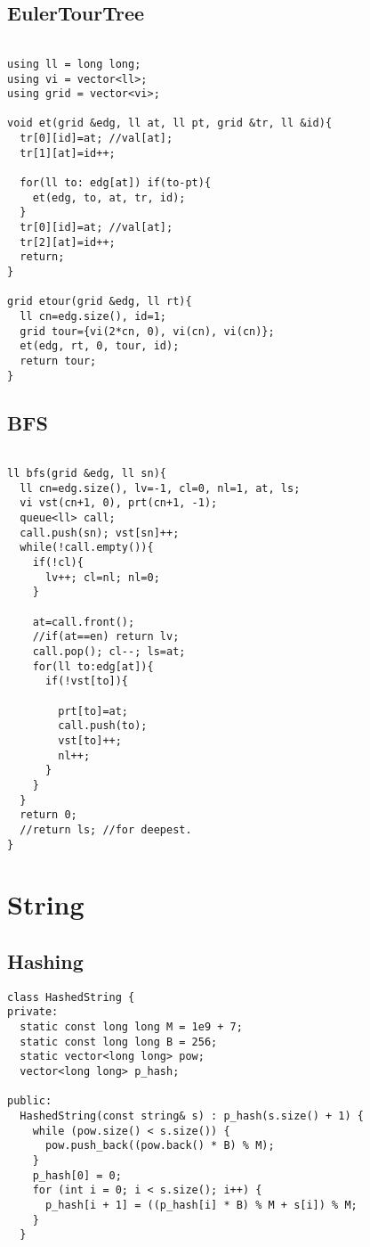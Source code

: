 \documentclass[FSZ,a4paper,onesided]{article}
\begin{document}
\begin{multicols*}{\COLS}
\subsection{EulerTourTree}
\begin{lstlisting}

using ll = long long;
using vi = vector<ll>;
using grid = vector<vi>;

void et(grid &edg, ll at, ll pt, grid &tr, ll &id){
  tr[0][id]=at; //val[at];
  tr[1][at]=id++;

  for(ll to: edg[at]) if(to-pt){
    et(edg, to, at, tr, id);
  }
  tr[0][id]=at; //val[at];
  tr[2][at]=id++;
  return;
}

grid etour(grid &edg, ll rt){
  ll cn=edg.size(), id=1;
  grid tour={vi(2*cn, 0), vi(cn), vi(cn)};
  et(edg, rt, 0, tour, id);
  return tour;
}
\end{lstlisting}
\subsection{BFS}
\begin{lstlisting}

ll bfs(grid &edg, ll sn){
  ll cn=edg.size(), lv=-1, cl=0, nl=1, at, ls;
  vi vst(cn+1, 0), prt(cn+1, -1);
  queue<ll> call;
  call.push(sn); vst[sn]++;
  while(!call.empty()){
    if(!cl){
      lv++; cl=nl; nl=0;
    }

    at=call.front();
    //if(at==en) return lv;
    call.pop(); cl--; ls=at;
    for(ll to:edg[at]){
      if(!vst[to]){

        prt[to]=at;
        call.push(to);
        vst[to]++;
        nl++;
      }
    }
  }
  return 0;
  //return ls; //for deepest.
}
\end{lstlisting}
\section{String}
\subsection{Hashing}
\begin{lstlisting}
class HashedString {
private:
  static const long long M = 1e9 + 7;
  static const long long B = 256;
  static vector<long long> pow;
  vector<long long> p_hash;

public:
  HashedString(const string& s) : p_hash(s.size() + 1) {
    while (pow.size() < s.size()) {
      pow.push_back((pow.back() * B) % M);
    }
    p_hash[0] = 0;
    for (int i = 0; i < s.size(); i++) {
      p_hash[i + 1] = ((p_hash[i] * B) % M + s[i]) % M;
    }
  }


\end{lstlisting}
\end{multicols*}
\end{document}
